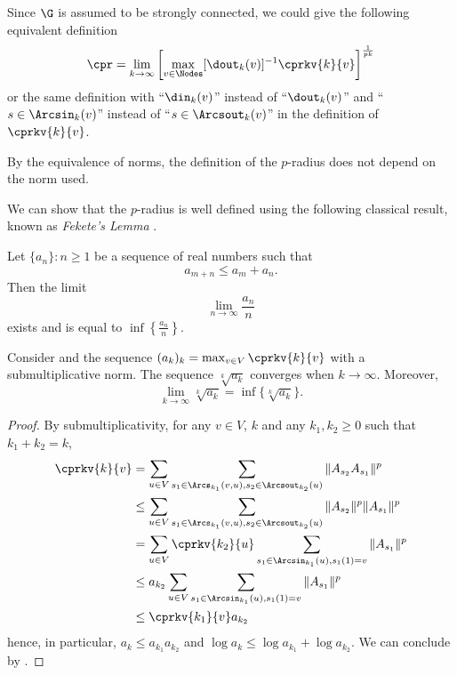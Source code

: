 \documentclass[11pt,twoside,a4paper,openright]{uclouvain-thesis}
\begin{document}
\begin{myrem}
  \label{rem:path}
  Since $\G$ is assumed to be strongly connected,
  we could give the following equivalent definition
  \begin{equation}
    \label{eq:cprk2}
    \cpr = \lim_{k \to \infty}
    \left[\max_{v \in \Nodes} [\dout_k(v)]^{-1} \cprkv{k}{v}\right]^{\frac{1}{pk}}
  \end{equation}
  or the same definition with ``$\din_k(v)$'' instead of ``$\dout_k(v)$'' and ``$s \in \Arcsin_k(v)$'' instead of ``$s \in \Arcsout_k(v)$'' in the definition of $\cprkv{k}{v}$.

\end{myrem}

By the equivalence of norms, the definition of the $p$-radius does not depend on the norm used.

We can show that the $p$-radius is well defined using the following classical result, known as \emph{Fekete's Lemma} \cite{fekete1923verteilung}.
\begin{mylem}
  \label{lem:fekete}
  Let $\{a_n\} : n \geq 1$ be a sequence of real numbers such that
  \[ a_{m + n} \leq a_m + a_n. \]
  Then the limit
  \[ \lim_{n \to \infty} \frac{a_n}{n} \]
  exists and is equal to $\inf\left\{\frac{a_n}{n}\right\}$.
\end{mylem}
\begin{mylem}
  \label{lem:feketemax}
  Consider  and
  the sequence $(a_k)_k = \max_{v \in V} \cprkv{k}{v}$ with a submultiplicative norm.
  The sequence $\sqrt[k]{a_k}$ converges when $k \to \infty$.
  Moreover,
  \[ \lim_{k \to \infty} \sqrt[k]{a_k} = \inf \{\sqrt[k]{a_k}\}. \]

  \begin{proof}
    By submultiplicativity, for any $v \in V$, $k$ and any $k_1,k_2 \geq 0$ such that $k_1 + k_2 = k$,
    \begin{align*}
      \cprkv{k}{v}
      & = \sum_{u \in V} \sum_{s_1 \in \Arcs_{k_1}(v,u),s_2\in \Arcsout_{k_2}(u)} \|A_{s_2}A_{s_1}\|^p\\
      & \leq \sum_{u \in V} \sum_{s_1 \in \Arcs_{k_1}(v,u),s_2\in \Arcsout_{k_2}(u)} \|A_{s_2}\|^p\|A_{s_1}\|^p\\
      & = \sum_{u \in V} \cprkv{k_2}{u} \sum_{s_1 \in \Arcsin_{k_1}(u),s_1(1)=v} \|A_{s_1}\|^p\\
      & \leq a_{k_2} \sum_{u \in V} \sum_{s_1 \in \Arcsin_{k_1}(u),s_1(1)=v} \|A_{s_1}\|^p\\
      & \leq \cprkv{k_1}{v} a_{k_2}
    \end{align*}
    hence, in particular, $a_k \leq a_{k_1} a_{k_2}$ and $\log a_k \leq \log a_{k_1} + \log a_{k_2}$.
    We can conclude by .
  \end{proof}
\end{mylem}
\end{document}
